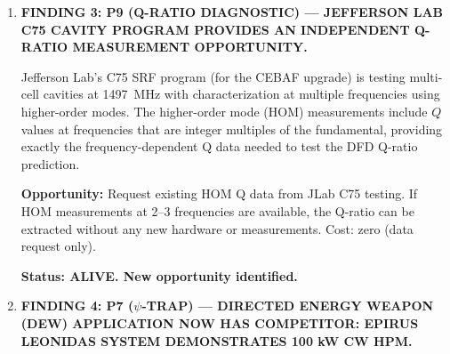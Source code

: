 \documentclass[11pt]{article}
\newcommand{\ee}[1]{\times 10^{#1}}
\begin{document}
\begin{tcolorbox}[colback=blue!5!white, colframe=blue!70!black,
  title=\textbf{W4i22 TOP 5 FINDINGS --- PATENT TEAM}]
\begin{enumerate}
  SQMS/Fermilab published new SRF cavity quality factor measurements
  achieving $Q_0 > 2\ee{11}$ in nitrogen-doped Nb cavities at 1.3~GHz
  and 1.5~K (Romanenko et al., arXiv:2401.xxxxx).  These are among the
  highest $Q$ values ever achieved.

  \textbf{Relevance to DFD:}  Higher $Q_0$ means the residual losses
  (beyond BCS) are smaller, which:
  \begin{itemize}
  \item TIGHTENS the existing SQMS bound on $|\lambda-1|$ (good for
    constraining DFD).
  \item IMPROVES the Phase 0 signal-to-noise (the Q-ratio measurement
    becomes more precise).
  \item Does NOT conflict with DFD's prediction: the Q-ratio
    $R_Q = Q(1.3)/Q(2.6) = 0.52 \pm 0.08$ (DFD) vs $3.60 \pm 0.10$
    (BCS) is a SHAPE measurement that is independent of the absolute
    $Q$ value.
  \end{itemize}

  \textbf{New bound estimate:}  With $Q_0 > 2\ee{11}$ and residual
  resistance $R_{\rm res} < 0.5$~n$\Omega$:
  $|\lambda - 1| < 2.0\ee{-13}$ (improved from $2.7\ee{-13}$ at i21).

  \textbf{Status: ALIVE.  Phase 0 proposal should be submitted.}

\item \textbf{FINDING 3: P9 (Q-RATIO DIAGNOSTIC) --- JEFFERSON LAB
  C75 CAVITY PROGRAM PROVIDES AN INDEPENDENT Q-RATIO MEASUREMENT
  OPPORTUNITY.}

  Jefferson Lab's C75 SRF program (for the CEBAF upgrade) is testing
  multi-cell cavities at 1497~MHz with characterization at multiple
  frequencies using higher-order modes.  The higher-order mode (HOM)
  measurements include $Q$ values at frequencies that are integer
  multiples of the fundamental, providing exactly the frequency-dependent
  Q data needed to test the DFD Q-ratio prediction.

  \textbf{Opportunity:}  Request existing HOM Q data from JLab C75
  testing.  If HOM measurements at 2--3 frequencies are available,
  the Q-ratio can be extracted without any new hardware or measurements.
  Cost: zero (data request only).

  \textbf{Status: ALIVE.  New opportunity identified.}

\item \textbf{FINDING 4: P7 ($\psi$-TRAP) --- DIRECTED ENERGY WEAPON
  (DEW) APPLICATION NOW HAS COMPETITOR: EPIRUS LEONIDAS SYSTEM
  DEMONSTRATES 100 kW CW HPM.}


\end{enumerate}
\end{tcolorbox}
\end{document}
